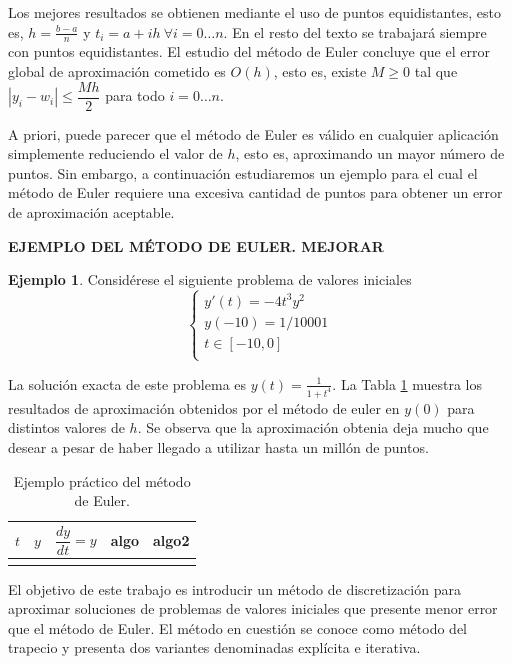 \documentclass{article}
\theoremstyle{theorem-style}  %
\theoremstyle{definition}
\theoremstyle{example-style}
\newtheorem{example}{Ejemplo}[section]
\begin{document}
	Los mejores resultados se obtienen mediante el uso de puntos equidistantes, esto es, $h = \frac{b-a}{n}$ y $t_i = a + ih \ \forall i = 0 \ldots n$. En el resto del texto se trabajará siempre con puntos equidistantes. El estudio del método de Euler concluye que el error global de aproximación cometido es $O(h)$, esto es, existe $M \ge 0$ tal que $\left|y_i - w_i\right| \le\dfrac{Mh}{2}$ para todo $i=0 \ldots n$.
				
	A priori, puede parecer que el método de Euler es válido en cualquier aplicación simplemente reduciendo el valor de $h$, esto es, aproximando un mayor número de puntos. Sin embargo, a continuación estudiaremos un ejemplo para el cual el método de Euler requiere una excesiva cantidad de puntos para obtener un error de aproximación aceptable. 
	
	\textbf{EJEMPLO DEL MÉTODO DE EULER. MEJORAR}
	
	\begin{example} Considérese el siguiente problema de valores iniciales
		\begin{equation*}
			\begin{cases}
			y'(t) = -4 t^3 y^2 \\
			y(-10) = 1/10001 \\
			t \in [-10,0] \\
			\end{cases}
		\end{equation*}

		La solución exacta de este problema es $y(t)=\frac{1}{1+t^4}$. La Tabla \ref{table:euler} muestra los resultados de aproximación obtenidos por el método de euler en $y(0)$ para distintos valores de $h$. Se observa que la aproximación obtenia  deja mucho que desear a pesar de haber llegado a utilizar hasta un millón de puntos. 
	\end{example}
	
	\begin{table}[H]
		\centering
		\begin{tabular}{|| c | c | c | c | c ||}
			\hline
			\hline
			$t$ &  $y$ & $\dfrac{dy}{dt}=y$ & algo & algo2\\
			\hline\\
			
		\end{tabular}
		\caption{Ejemplo práctico del método de Euler.}
		\label{table:euler}
	\end{table}
	
	El objetivo de este trabajo es introducir un método de discretización para aproximar soluciones de problemas de valores iniciales que presente menor error que el método de Euler. El método en cuestión se conoce como método del trapecio y presenta dos variantes denominadas explícita e iterativa. 
	
\end{document}
